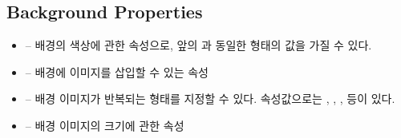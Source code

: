 \subsection*{Background Properties}

\begin{itemize}
    \item {} – 배경의 색상에 관한 속성으로, 앞의 과 동일한 형태의 값을 가질 수 있다.
    \item {} – 배경에 이미지를 삽입할 수 있는 속성
    \item {} – 배경 이미지가 반복되는 형태를 지정할 수 있다. 속성값으로는 , , ,  등이 있다.
    \item {} – 배경 이미지의 크기에 관한 속성
\end{itemize}
